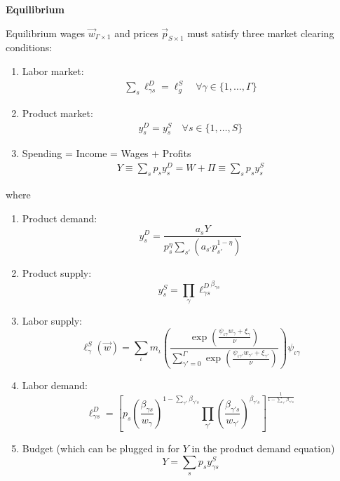 \documentclass[12pt]{article}
\def\ig{\iota\gamma}
\def\g{\gamma}
\def\i{\iota}
\theoremstyle{definition}
\theoremstyle{plain}
\begin{document}
\textbf{Equilibrium}

Equilibrium wages $\vec{w}_{\Gamma \times 1}$ and prices $\vec{p}_{S \times 1}$ must satisfy three market clearing conditions:
\begin{enumerate}
	\item Labor market:
	\begin{align*}
	\sum_s \ell_{\g s}^D = \ell_{g}^S \quad \forall \g\in\{1,\dots,\Gamma\}
	\end{align*}
	\item Product market:
	\begin{align*}
	y_s^D = y_s^S  \quad \forall s \in \{1,\dots,S \}
	\end{align*}
	\item Spending = Income = Wages + Profits
	\begin{align*}
	Y \equiv  \sum_s p_s y_s^D = W + \Pi \equiv \sum_s p_s y_s^S
	\end{align*}
\end{enumerate}
where
\begin{enumerate}
	\item Product demand:
	\[ y_s^D = \frac{ a_s Y}{p_s^{\eta} \sum_{s'} \left(a_{s'} p_{s'}^{1-\eta}\right)} \]
	\item Product supply:
	\[ y_s^S = \prod_{\g} {\ell_{\g s}^D}^{\beta_{\g s}} \]
	\item Labor supply:
	\[ \ell_{\g}^S(\vec{w})  = \sum_{\i} m_{\i} \left( \frac{\exp \left( \frac{\psi_{\ig} w_{\g} + \xi_{\g}}{\nu} \right) }{ \sum\limits_{\g'=0}^{\Gamma} \exp \left( \frac{\psi_{\ig'} w_{\g'} + \xi_{\g'}}{\nu} \right) } \right) \psi_{\ig}  \]
	\item Labor demand:
	\[ \ell_{\g s}^D = \left[ p_s \left( \frac{\beta_{\g s}}{w_{\g}} \right)^{1-\sum_{\g'} \beta_{\g' s}} \prod_{\g'} \left(\frac{\beta_{\g' s}}{w_{\g'}} \right)^{\beta_{\g' s}} \right]^{\frac{1}{1-\sum_{\g'} \beta_{\g' s}}} \]
	\item Budget (which can be plugged in for $Y$ in the product demand equation)
	\[ Y = \sum_s p_s y_{\g s}^S \]
\end{enumerate}
\end{document}

